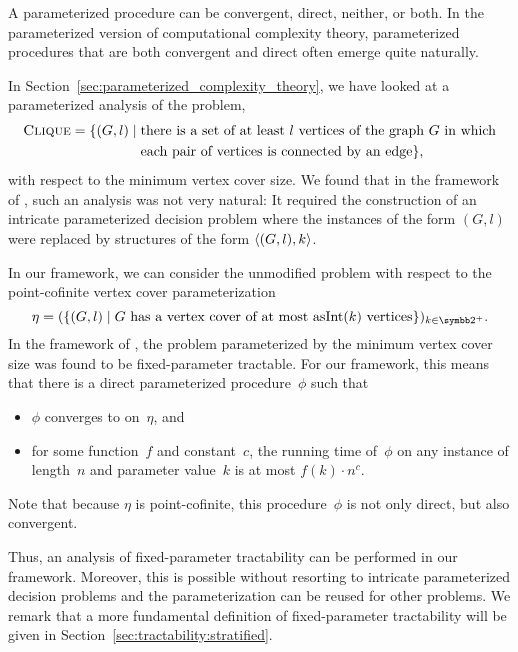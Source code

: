 A parameterized procedure can be convergent, direct, neither, or both.
In the parameterized version of computational complexity theory, parameterized procedures that are both convergent and direct often emerge quite naturally.
\begin{example}
\label{ex:clique_vc}%
  In Section~\ref{sec:parameterized_complexity_theory}, we have looked at a parameterized analysis of the  problem,
  \begin{align*}
    \textnormal{\textsc{Clique}} = \{(G, l) \;|\; &\text{there is a set of at least $l$ vertices of the graph $G$ in which} \\
          &\text{each pair of vertices is connected by an edge}\},
  \end{align*}
  with respect to the minimum vertex cover size.
  We found that in the framework of \citeauthor{downey1999parameterized}, such an analysis was not very natural:
  It required the construction of an intricate parameterized decision problem where the instances of the form $(G, l)$ were replaced by structures of the form ${\langle (G, l), k\rangle}$.

  In our framework, we can consider the unmodified  problem with respect to the point-cofinite vertex cover parameterization
  \begin{equation*}
    \eta \deq (\{(G, l) \st \text{$G$ has a vertex cover of at most $\asNat(k)$ vertices}\})_{k \in \binary^+}.
  \end{equation*}
  In the framework of \citeauthor{downey1999parameterized}, the  problem parameterized by the minimum vertex cover size was found to be fixed-parameter tractable.
  For our framework, this means that there is a direct parameterized procedure~$\phi$ such that
  \begin{itemize}
  \item $\phi$ converges to  on~$\eta$, and
  \item for some function~$f$ and constant~$c$, the running time of~$\phi$ on any instance of length~$n$ and parameter value~$k$ is at most $f(k) \cdot n^c$.
  \end{itemize}
  Note that because $\eta$ is point-cofinite, this procedure~$\phi$ is not only direct, but also convergent.

  Thus, an analysis of fixed-parameter tractability can be performed in our framework.
  Moreover, this is possible without resorting to intricate parameterized decision problems and the parameterization can be reused for other problems.
  We remark that a more fundamental definition of fixed-parameter tractability will be given in Section~\ref{sec:tractability:stratified}.
\end{example}

